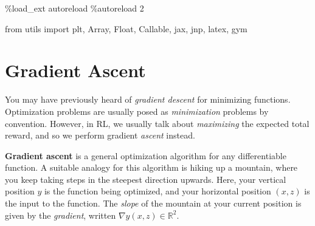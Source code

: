 \documentclass[
  letterpaper,
  DIV=11,
  numbers=noendperiod]{scrreprt}
\newenvironment{Shaded}{\begin{snugshade}}{\end{snugshade}}
\newcommand{\DecValTok}[1]{\textcolor[rgb]{0.68,0.00,0.00}{#1}}
\newcommand{\ImportTok}[1]{\textcolor[rgb]{0.00,0.46,0.62}{#1}}
\newcommand{\NormalTok}[1]{\textcolor[rgb]{0.00,0.23,0.31}{#1}}
\newcommand{\OperatorTok}[1]{\textcolor[rgb]{0.37,0.37,0.37}{#1}}
\theoremstyle{plain}
\theoremstyle{plain}
\theoremstyle{definition}
\theoremstyle{definition}
\theoremstyle{remark}
\begin{document}
\begin{Shaded}
\begin{Highlighting}[]
\OperatorTok{\%}\NormalTok{load\_ext autoreload}
\OperatorTok{\%}\NormalTok{autoreload }\DecValTok{2}
\end{Highlighting}
\end{Shaded}

\begin{Shaded}
\begin{Highlighting}[]
\ImportTok{from}\NormalTok{ utils }\ImportTok{import}\NormalTok{ plt, Array, Float, Callable, jax, jnp, latex, gym}
\end{Highlighting}
\end{Shaded}

\section{Gradient Ascent}\label{gradient-ascent}

You may have previously heard of \emph{gradient descent} for minimizing
functions. Optimization problems are usually posed as
\emph{minimization} problems by convention. However, in RL, we usually
talk about \emph{maximizing} the expected total reward, and so we
perform gradient \emph{ascent} instead.

\textbf{Gradient ascent} is a general optimization algorithm for any
differentiable function. A suitable analogy for this algorithm is hiking
up a mountain, where you keep taking steps in the steepest direction
upwards. Here, your vertical position \(y\) is the function being
optimized, and your horizontal position \((x, z)\) is the input to the
function. The \emph{slope} of the mountain at your current position is
given by the \emph{gradient}, written
\(\nabla y(x, z) \in \mathbb{R}^2\).
\end{document}

